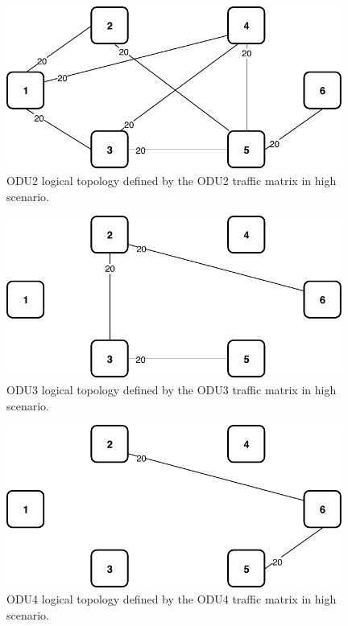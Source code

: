 \begin{figure}[h!]
\centering
\includegraphics[width=11cm]{sdf/ilp/opaque_survivability/figures/logical_topology_ODU2_high}
\caption{ODU2 logical topology defined by the ODU2 traffic matrix in high scenario.}
\label{logical_ODU2_high}
\end{figure}

\begin{figure}[h!]
\centering
\includegraphics[width=11cm]{sdf/ilp/opaque_survivability/figures/logical_topology_ODU3_high}
\caption{ODU3 logical topology defined by the ODU3 traffic matrix in high scenario.}
\label{logical_ODU3_high}
\end{figure}

\begin{figure}[h!]
\centering
\includegraphics[width=11cm]{sdf/ilp/opaque_survivability/figures/logical_topology_ODU4_high}
\caption{ODU4 logical topology defined by the ODU4 traffic matrix in high scenario.}
\label{logical_ODU4_high}
\end{figure}
